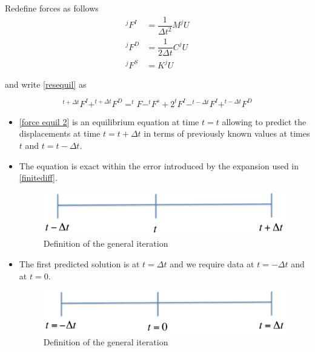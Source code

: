 
Redefine forces as follows
\begin{equation}
\begin{aligned}
^{j}F^I&=\dfrac{1}{\Delta t^2}M ^{j}U\\
^{j}F^D&=\dfrac{1}{2 \Delta t}C ^{j}U\\
^{j}F^S&=K ^{j}U
\end{aligned}
\label{redefine}
\end{equation}

and write \eqref{resequil} as

\begin{equation}
^{t+\Delta t}F^I+^{t+\Delta t}F^D=^{t}F-^{t}F^s+2 ^{t}F^I-^{t-\Delta t}F^I+^{t-\Delta t}F^D
\label{force equil 2}
\end{equation}

\begin{itemize}
\item \eqref{force equil 2} is an equilibrium equation at time $t=t$ allowing to predict the displacements at time $t=t+\Delta t$ in terms of previously known values at times $t$ and $t=t-\Delta t$.

\item The equation is exact within the error introduced by the expansion used in \eqref{finitediff}.

\begin{figure}[h]
\centering
\includegraphics[width=12cm]{img/figure7_0.pdf}
\caption{Definition of the general iteration}
\label{fig:time iteration}
\end{figure}

\item The first predicted solution is at $t=\Delta t$ and we require data at $t=-\Delta t$ and at $t=0$.

\begin{figure}[h]
\centering
\includegraphics[width=12cm]{img/figure7_1.pdf}
\caption{Definition of the general iteration}
\label{fig:initial time iteration}
\end{figure}

\end{itemize}

